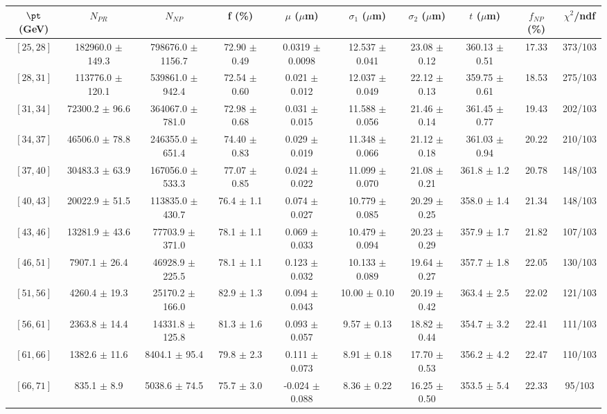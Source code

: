 \begin{tabular}{c||c|c|c|c|c|c|c||c|c}
$\pt$ (GeV) & $N_{PR}$ & $N_{NP}$ & f (\%) & $\mu$ ($\mu$m) & $\sigma_1$ ($\mu$m) & $\sigma_2$ ($\mu$m)  & $t$ ($\mu$m) & $f_{NP}$ (\%) & $\chi^2$/ndf \\
\hline
$[25, 28]$ & 182960.0 $\pm$ 149.3 & 798676.0 $\pm$ 1156.7 & 72.90 $\pm$ 0.49 & 0.0319 $\pm$ 0.0098 & 12.537 $\pm$ 0.041 & 23.08 $\pm$ 0.12 & 360.13 $\pm$ 0.51 & 17.33 & 373/103\\
$[28, 31]$ & 113776.0 $\pm$ 120.1 & 539861.0 $\pm$ 942.4 & 72.54 $\pm$ 0.60 & 0.021 $\pm$ 0.012 & 12.037 $\pm$ 0.049 & 22.12 $\pm$ 0.13 & 359.75 $\pm$ 0.61 & 18.53 & 275/103\\
$[31, 34]$ & 72300.2 $\pm$ 96.6 & 364067.0 $\pm$ 781.0 & 72.98 $\pm$ 0.68 & 0.031 $\pm$ 0.015 & 11.588 $\pm$ 0.056 & 21.46 $\pm$ 0.14 & 361.45 $\pm$ 0.77 & 19.43 & 202/103\\
$[34, 37]$ & 46506.0 $\pm$ 78.8 & 246355.0 $\pm$ 651.4 & 74.40 $\pm$ 0.83 & 0.029 $\pm$ 0.019 & 11.348 $\pm$ 0.066 & 21.12 $\pm$ 0.18 & 361.03 $\pm$ 0.94 & 20.22 & 210/103\\
$[37, 40]$ & 30483.3 $\pm$ 63.9 & 167056.0 $\pm$ 533.3 & 77.07 $\pm$ 0.85 & 0.024 $\pm$ 0.022 & 11.099 $\pm$ 0.070 & 21.08 $\pm$ 0.21 & 361.8 $\pm$ 1.2 & 20.78 & 148/103\\
$[40, 43]$ & 20022.9 $\pm$ 51.5 & 113835.0 $\pm$ 430.7 & 76.4 $\pm$ 1.1 & 0.074 $\pm$ 0.027 & 10.779 $\pm$ 0.085 & 20.29 $\pm$ 0.25 & 358.0 $\pm$ 1.4 & 21.34 & 148/103\\
$[43, 46]$ & 13281.9 $\pm$ 43.6 & 77703.9 $\pm$ 371.0 & 78.1 $\pm$ 1.1 & 0.069 $\pm$ 0.033 & 10.479 $\pm$ 0.094 & 20.23 $\pm$ 0.29 & 357.9 $\pm$ 1.7 & 21.82 & 107/103\\
$[46, 51]$ & 7907.1 $\pm$ 26.4 & 46928.9 $\pm$ 225.5 & 78.1 $\pm$ 1.1 & 0.123 $\pm$ 0.032 & 10.133 $\pm$ 0.089 & 19.64 $\pm$ 0.27 & 357.7 $\pm$ 1.8 & 22.05 & 130/103\\
$[51, 56]$ & 4260.4 $\pm$ 19.3 & 25170.2 $\pm$ 166.0 & 82.9 $\pm$ 1.3 & 0.094 $\pm$ 0.043 & 10.00 $\pm$ 0.10 & 20.19 $\pm$ 0.42 & 363.4 $\pm$ 2.5 & 22.02 & 121/103\\
$[56, 61]$ & 2363.8 $\pm$ 14.4 & 14331.8 $\pm$ 125.8 & 81.3 $\pm$ 1.6 & 0.093 $\pm$ 0.057 & 9.57 $\pm$ 0.13 & 18.82 $\pm$ 0.44 & 354.7 $\pm$ 3.2 & 22.41 & 111/103\\
$[61, 66]$ & 1382.6 $\pm$ 11.6 & 8404.1 $\pm$ 95.4 & 79.8 $\pm$ 2.3 & 0.111 $\pm$ 0.073 & 8.91 $\pm$ 0.18 & 17.70 $\pm$ 0.53 & 356.2 $\pm$ 4.2 & 22.47 & 110/103\\
$[66, 71]$ & 835.1 $\pm$ 8.9 & 5038.6 $\pm$ 74.5 & 75.7 $\pm$ 3.0 & -0.024 $\pm$ 0.088 & 8.36 $\pm$ 0.22 & 16.25 $\pm$ 0.50 & 353.5 $\pm$ 5.4 & 22.33 & 95/103\\

\end{tabular}
